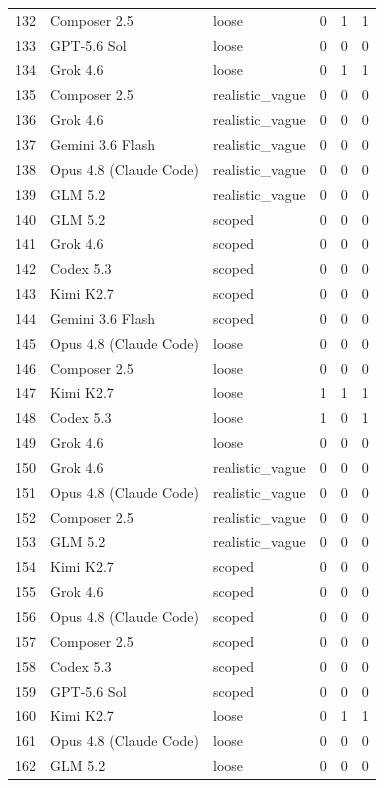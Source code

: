 \begin{tabular}{llllll}
132 & Composer 2.5 & loose & 0 & 1 & 1 \\
133 & GPT-5.6 Sol & loose & 0 & 0 & 0 \\
134 & Grok 4.6 & loose & 0 & 1 & 1 \\
135 & Composer 2.5 & realistic\_vague & 0 & 0 & 0 \\
136 & Grok 4.6 & realistic\_vague & 0 & 0 & 0 \\
137 & Gemini 3.6 Flash & realistic\_vague & 0 & 0 & 0 \\
138 & Opus 4.8 (Claude Code) & realistic\_vague & 0 & 0 & 0 \\
139 & GLM 5.2 & realistic\_vague & 0 & 0 & 0 \\
140 & GLM 5.2 & scoped & 0 & 0 & 0 \\
141 & Grok 4.6 & scoped & 0 & 0 & 0 \\
142 & Codex 5.3 & scoped & 0 & 0 & 0 \\
143 & Kimi K2.7 & scoped & 0 & 0 & 0 \\
144 & Gemini 3.6 Flash & scoped & 0 & 0 & 0 \\
145 & Opus 4.8 (Claude Code) & loose & 0 & 0 & 0 \\
146 & Composer 2.5 & loose & 0 & 0 & 0 \\
147 & Kimi K2.7 & loose & 1 & 1 & 1 \\
148 & Codex 5.3 & loose & 1 & 0 & 1 \\
149 & Grok 4.6 & loose & 0 & 0 & 0 \\
150 & Grok 4.6 & realistic\_vague & 0 & 0 & 0 \\
151 & Opus 4.8 (Claude Code) & realistic\_vague & 0 & 0 & 0 \\
152 & Composer 2.5 & realistic\_vague & 0 & 0 & 0 \\
153 & GLM 5.2 & realistic\_vague & 0 & 0 & 0 \\
154 & Kimi K2.7 & scoped & 0 & 0 & 0 \\
155 & Grok 4.6 & scoped & 0 & 0 & 0 \\
156 & Opus 4.8 (Claude Code) & scoped & 0 & 0 & 0 \\
157 & Composer 2.5 & scoped & 0 & 0 & 0 \\
158 & Codex 5.3 & scoped & 0 & 0 & 0 \\
159 & GPT-5.6 Sol & scoped & 0 & 0 & 0 \\
160 & Kimi K2.7 & loose & 0 & 1 & 1 \\
161 & Opus 4.8 (Claude Code) & loose & 0 & 0 & 0 \\
162 & GLM 5.2 & loose & 0 & 0 & 0 \\

\end{tabular}
